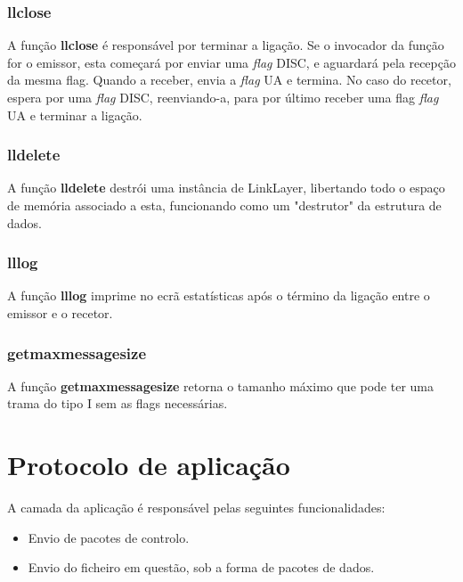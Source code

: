\documentclass[11pt,a4paper,reqno]{article}
\numberwithin{equation}{section}
\begin{document}
\subsubsection{llclose}

A função \textbf{llclose} é responsável por terminar a ligação. Se o invocador da função for o emissor, esta começará por enviar uma \textit{flag} DISC, e aguardará pela recepção da mesma flag. Quando a receber, envia a \textit{flag} UA e termina. No caso do recetor, espera por uma \textit{flag} DISC, reenviando-a, para por último receber uma flag \textit{flag} UA e terminar a ligação.

\subsubsection{lldelete}

A função \textbf{lldelete} destrói uma instância de LinkLayer, libertando todo o espaço de memória associado a esta, funcionando como um "destrutor" da estrutura de dados.

\subsubsection{lllog}

A função \textbf{lllog} imprime no ecrã estatísticas após o término da ligação entre o emissor e o recetor.

\subsubsection{get\textunderscore max\textunderscore message\textunderscore size}

A função \textbf{get\textunderscore max\textunderscore message\textunderscore size} retorna o tamanho máximo que pode ter uma trama do tipo I sem as flags necessárias.


\section{Protocolo de aplicação}

A camada da aplicação é responsável pelas seguintes funcionalidades:

\begin{itemize}
	\item Envio de pacotes de controlo.
	\item Envio do ficheiro em questão, sob a forma de pacotes de dados.
\end{itemize}
\end{document}
